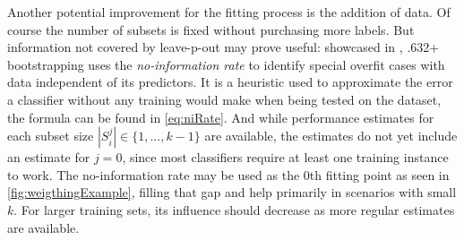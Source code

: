 Another potential improvement for the fitting process is the addition of data. Of course the number of subsets is fixed without purchasing more labels. But information not covered by leave-p-out may prove useful: showcased in \cite{EfronEtAl1997}, .632+ bootstrapping uses the \textit{no-information rate} to identify special overfit cases with data independent of its predictors. It is a heuristic used to approximate the error a classifier without any training would make when being tested on the dataset, the formula can be found in \ref{eq:niRate}. And while performance estimates for each subset size $|S^j_i| \in \{1, ..., k-1\}$ are available, the estimates do not yet include an estimate for $j = 0$, since most classifiers require at least one training instance to work. The no-information rate may be used as the 0th fitting point as seen in \ref{fig:weigthingExample}, filling that gap and help primarily in scenarios with small $k$. For larger training sets, its influence should decrease as more regular estimates are available.